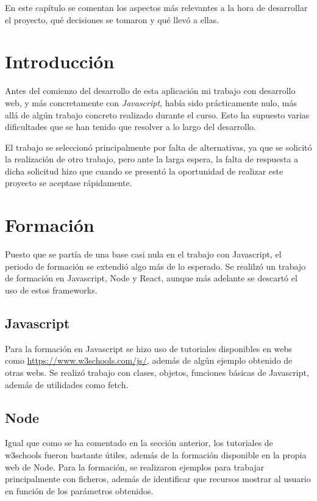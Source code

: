 
En este capítulo se comentan los aspectos más relevantes a la hora de desarrollar el proyecto, qué decisiones se tomaron y qué llevó a ellas.

\section{Introducción}

Antes del comienzo del desarrollo de esta aplicación mi trabajo con desarrollo web, y más concretamente con \emph{Javascript}, había sido prácticamente nulo, más allá de algún trabajo concreto realizado durante el curso. Esto ha supuesto varias dificultades que se han tenido que resolver a lo largo del desarrollo.

El trabajo se seleccionó principalmente por falta de alternativas, ya que se solicitó la realización de otro trabajo, pero ante la larga espera, la falta de respuesta a dicha solicitud hizo que cuando se presentó la oportunidad de realizar este proyecto se aceptase rápidamente.

\section{Formación}

Puesto que se partía de una base casi nula en el trabajo con Javascript, el periodo de formación se extendió algo más de lo esperado. Se realilzó un trabajo de formación en Javascript, Node y React, aunque más adelante se descartó el uso de estos frameworks.

\subsection{Javascript}

Para la formación en Javascript se hizo uso de tutoriales disponibles en webs como \url{https://www.w3schools.com/js/}, además de algún ejemplo obtenido de otras webs. Se realizó trabajo con clases, objetos, funciones básicas de Javascript, además de utilidades como fetch.

\subsection{Node}

Igual que como se ha comentado en la sección anterior, los tutoriales de w3schools fueron bastante útiles, además de la formación disponible en la propia web de Node. Para la formación, se realizaron ejemplos para trabajar principalmente con ficheros, además de identificar que recursos mostrar al usuario en función de los parámetros obtenidos.

